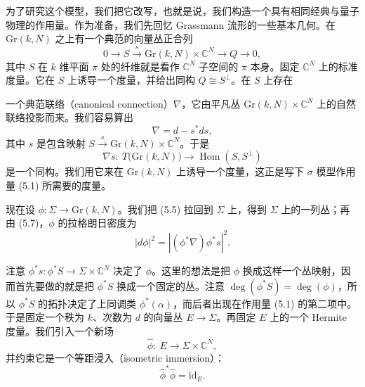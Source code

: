 为了研究这个模型，我们把它改写，也就是说，我们构造一个具有相同经典与量子物理的作用量。作为准备，我们先回忆 Grassmann 流形的一些基本几何。在 $\mathrm{Gr}(k,N)$ 之上有一个典范的向量丛正合列
\begin{equation}
  \tag{5.5}
  \label{eq:5-5}
  0\longrightarrow S\xrightarrow{\ s\ }\mathrm{Gr}(k,N)\times\mathbb{C}^N\longrightarrow Q\longrightarrow 0,
\end{equation}
其中 $S$ 在 $k$ 维平面 $\pi$ 处的纤维就是看作 $\mathbb{C}^N$ 子空间的 $\pi$ 本身。固定 $\mathbb{C}^N$ 上的标准度量。它在 $S$ 上诱导一个度量，并给出同构 $Q\cong S^\perp$。在 $S$ 上存在

一个典范联络（canonical connection）$\nabla$，它由平凡丛 $\mathrm{Gr}(k,N)\times\mathbb{C}^N$ 上的自然联络投影而来。我们容易算出
\begin{equation}
  \tag{5.6}
  \label{eq:5-6}
  \nabla=d-s^*ds,
\end{equation}
其中 $s$ 是包含映射 $S\xrightarrow{\ s\ }\mathrm{Gr}(k,N)\times\mathbb{C}^N$。于是
\begin{equation}
  \tag{5.7}
  \label{eq:5-7}
  \nabla s:\ T\bigl(\mathrm{Gr}(k,N)\bigr)\longrightarrow\operatorname{Hom}(S,S^\perp)
\end{equation}
是一个同构。我们用它来在 $\mathrm{Gr}(k,N)$ 上诱导一个度量，这正是写下 $\sigma$ 模型作用量 (5.1) 所需要的度量。

现在设 $\phi:\Sigma\to\mathrm{Gr}(k,N)$。我们把 (5.5) 拉回到 $\Sigma$ 上，得到 $\Sigma$ 上的一列丛；再由 (5.7)，$\phi$ 的拉格朗日密度为
\begin{equation}
  \tag{5.8}
  \label{eq:5-8}
  |d\phi|^2=|(\phi^*\nabla)\phi^*s|^2 .
\end{equation}

注意 $\phi^*s:\phi^*S\to\Sigma\times\mathbb{C}^N$ 决定了 $\phi$。这里的想法是把 $\phi$ 换成这样一个丛映射，因而首先要做的就是把 $\phi^*S$ 换成一个固定的丛。注意 $\deg(\phi^*S)=\deg(\phi)$，所以 $\phi^*S$ 的拓扑决定了上同调类 $\phi^*(\alpha)$，而后者出现在作用量 (5.1) 的第二项中。于是固定一个秩为 $k$、次数为 $d$ 的向量丛 $E\to\Sigma$。再固定 $E$ 上的一个 Hermite 度量。我们引入一个新场
\[
  \hat\phi:\ E\longrightarrow\Sigma\times\mathbb{C}^N,
\]
并约束它是一个等距浸入（isometric immersion）：
\begin{equation}
  \tag{5.9}
  \label{eq:5-9}
  \hat\phi^*\hat\phi=\mathrm{id}_E .
\end{equation}

